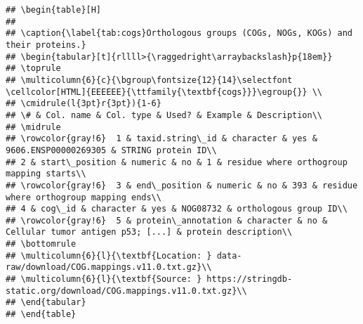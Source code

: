 \begin{verbatim}
## \begin{table}[H]
## 
## \caption{\label{tab:cogs}Orthologous groups (COGs, NOGs, KOGs) and their proteins.}
## \begin{tabular}[t]{rllll>{\raggedright\arraybackslash}p{18em}}
## \toprule
## \multicolumn{6}{c}{\bgroup\fontsize{12}{14}\selectfont \cellcolor[HTML]{EEEEEE}{\ttfamily{\textbf{cogs}}}\egroup{}} \\
## \cmidrule(l{3pt}r{3pt}){1-6}
## \# & Col. name & Col. type & Used? & Example & Description\\
## \midrule
## \rowcolor{gray!6}  1 & taxid.string\_id & character & yes & 9606.ENSP00000269305 & STRING protein ID\\
## 2 & start\_position & numeric & no & 1 & residue where orthogroup mapping starts\\
## \rowcolor{gray!6}  3 & end\_position & numeric & no & 393 & residue where orthogroup mapping ends\\
## 4 & cog\_id & character & yes & NOG08732 & orthologous group ID\\
## \rowcolor{gray!6}  5 & protein\_annotation & character & no & Cellular tumor antigen p53; [...] & protein description\\
## \bottomrule
## \multicolumn{6}{l}{\textbf{Location: } data-raw/download/COG.mappings.v11.0.txt.gz}\\
## \multicolumn{6}{l}{\textbf{Source: } https://stringdb-static.org/download/COG.mappings.v11.0.txt.gz}\\
## \end{tabular}
## \end{table}
\end{verbatim}

